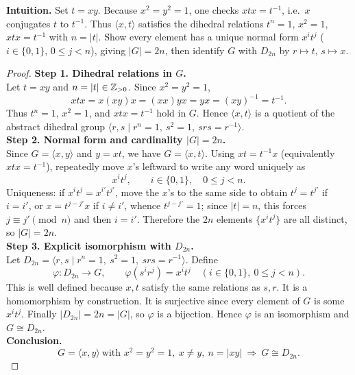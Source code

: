 \documentclass[12pt]{article}
\theoremstyle{definition}
\begin{document}
\dotfill

\noindent\textbf{Intuition.}
Set $t=xy$. Because $x^2=y^2=1$, one checks $xtx=t^{-1}$, i.e.\ $x$ conjugates $t$ to $t^{-1}$.
Thus $\langle x,t\rangle$ satisfies the dihedral relations $t^n=1$, $x^2=1$, $xtx=t^{-1}$ with $n=|t|$.
Show every element has a unique normal form $x^i t^j$ ($i\in\{0,1\}$, $0\le j<n$), giving $|G|=2n$,
then identify $G$ with $D_{2n}$ by $r\mapsto t$, $s\mapsto x$.\\

\dotfill

\begin{proof}
\noindent\textbf{Step 1. Dihedral relations in $G$.}\\
\noindent Let $t=xy$ and $n=|t|\in\Bbb Z_{>0}$. Since $x^2=y^2=1$,
\[
xtx=x(xy)x=(xx)y x = yx = (xy)^{-1}=t^{-1}.
\]
Thus $t^n=1$, $x^2=1$, and $xtx=t^{-1}$ hold in $G$. Hence $\langle x,t\rangle$ is a quotient of
the abstract dihedral group $\langle r,s\mid r^{n}=1,\ s^{2}=1,\ srs=r^{-1}\rangle$.\\

\noindent\textbf{Step 2. Normal form and cardinality $|G|=2n$.}\\
\noindent Since $G=\langle x,y\rangle$ and $y=xt$, we have $G=\langle x,t\rangle$. Using $xt= t^{-1}x$
(equivalently $xtx=t^{-1}$), repeatedly move $x$’s leftward to write any word uniquely as
\[
x^i t^j,\qquad i\in\{0,1\},\quad 0\le j<n.
\]
Uniqueness: if $x^i t^j=x^{i'} t^{j'}$, move the $x$’s to the same side to obtain $t^j=t^{j'}$ if $i=i'$,
or $x=t^{j-j'}x$ if $i\ne i'$, whence $t^{j-j'}=1$; since $|t|=n$, this forces $j\equiv j'\pmod n$ and then $i=i'$.
Therefore the $2n$ elements $\{x^i t^j\}$ are all distinct, so $|G|=2n$.\\

\noindent\textbf{Step 3. Explicit isomorphism with $D_{2n}$.}\\
\noindent Let $D_{2n}=\langle r,s\mid r^n=1,\ s^2=1,\ srs=r^{-1}\rangle$. Define
\[
\varphi:D_{2n}\longrightarrow G,\qquad \varphi(s^i r^j)=x^i t^j
\quad (i\in\{0,1\},\ 0\le j<n).
\]
This is well defined because $x,t$ satisfy the same relations as $s,r$. It is a homomorphism by construction.
It is surjective since every element of $G$ is some $x^i t^j$. Finally $|D_{2n}|=2n=|G|$, so $\varphi$
is a bijection. Hence $\varphi$ is an isomorphism and $G\cong D_{2n}$.\\

\noindent\textbf{Conclusion.}
\[
\boxed{\,G=\langle x,y\rangle\ \text{with }x^2=y^2=1,\ x\neq y,\ n=|xy|\ \Longrightarrow\ G\cong D_{2n}.\,}
\]
\end{proof}
\end{document}
